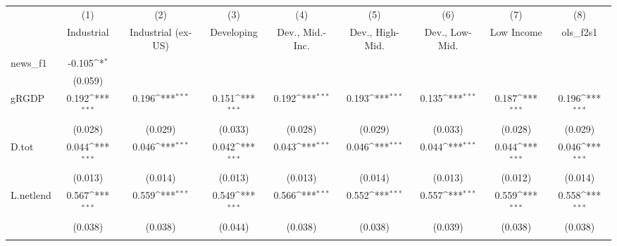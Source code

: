 {
\def\sym#1{\ifmmode^{#1}\else\(^{#1}\)\fi}
\begin{tabular}{l*{8}{c}}
\toprule
            &\multicolumn{1}{c}{(1)}&\multicolumn{1}{c}{(2)}&\multicolumn{1}{c}{(3)}&\multicolumn{1}{c}{(4)}&\multicolumn{1}{c}{(5)}&\multicolumn{1}{c}{(6)}&\multicolumn{1}{c}{(7)}&\multicolumn{1}{c}{(8)}\\
            &\multicolumn{1}{c}{Industrial}&\multicolumn{1}{c}{Industrial (ex-US)}&\multicolumn{1}{c}{Developing}&\multicolumn{1}{c}{Dev., Mid.-Inc.}&\multicolumn{1}{c}{Dev., High-Mid.}&\multicolumn{1}{c}{Dev., Low-Mid.}&\multicolumn{1}{c}{Low Income}&\multicolumn{1}{c}{ols\_f2s1}\\
\midrule
news\_f1     &      -0.105\sym{*}  &                     &                     &                     &                     &                     &                     &                     \\
            &     (0.059)         &                     &                     &                     &                     &                     &                     &                     \\
\addlinespace
gRGDP       &       0.192\sym{***}&       0.196\sym{***}&       0.151\sym{***}&       0.192\sym{***}&       0.193\sym{***}&       0.135\sym{***}&       0.187\sym{***}&       0.196\sym{***}\\
            &     (0.028)         &     (0.029)         &     (0.033)         &     (0.028)         &     (0.029)         &     (0.033)         &     (0.028)         &     (0.029)         \\
\addlinespace
D.tot       &       0.044\sym{***}&       0.046\sym{***}&       0.042\sym{***}&       0.043\sym{***}&       0.046\sym{***}&       0.044\sym{***}&       0.044\sym{***}&       0.046\sym{***}\\
            &     (0.013)         &     (0.014)         &     (0.013)         &     (0.013)         &     (0.014)         &     (0.013)         &     (0.012)         &     (0.014)         \\
\addlinespace
L.netlend   &       0.567\sym{***}&       0.559\sym{***}&       0.549\sym{***}&       0.566\sym{***}&       0.552\sym{***}&       0.557\sym{***}&       0.559\sym{***}&       0.558\sym{***}\\
            &     (0.038)         &     (0.038)         &     (0.044)         &     (0.038)         &     (0.038)         &     (0.039)         &     (0.038)         &     (0.038)         \\
\addlinespace

\end{tabular}}
